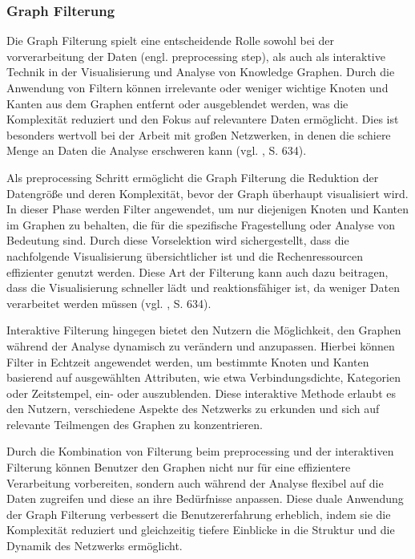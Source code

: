 \subsubsection{Graph Filterung}

Die Graph Filterung spielt eine entscheidende Rolle sowohl bei der vorverarbeitung der Daten (engl. preprocessing step), als auch als interaktive Technik in der Visualisierung und Analyse von Knowledge Graphen. Durch die Anwendung von Filtern können irrelevante oder weniger wichtige Knoten und Kanten aus dem Graphen entfernt oder ausgeblendet werden, was die Komplexität reduziert und den Fokus auf relevantere Daten ermöglicht. Dies ist besonders wertvoll bei der Arbeit mit großen Netzwerken, in denen die schiere Menge an Daten die Analyse erschweren kann (vgl. \cite{chen:SurveyGraphVisualization}, S. 634).

Als preprocessing Schritt ermöglicht die Graph Filterung die Reduktion der Datengröße und deren Komplexität, bevor der Graph überhaupt visualisiert wird. In dieser Phase werden Filter angewendet, um nur diejenigen Knoten und Kanten im Graphen zu behalten, die für die spezifische Fragestellung oder Analyse von Bedeutung sind. Durch diese Vorselektion wird sichergestellt, dass die nachfolgende Visualisierung übersichtlicher ist und die Rechenressourcen effizienter genutzt werden. Diese Art der Filterung kann auch dazu beitragen, dass die Visualisierung schneller lädt und reaktionsfähiger ist, da weniger Daten verarbeitet werden müssen (vgl. \cite{chen:SurveyGraphVisualization}, S. 634).

Interaktive Filterung hingegen bietet den Nutzern die Möglichkeit, den Graphen während der Analyse dynamisch zu verändern und anzupassen. Hierbei können Filter in Echtzeit angewendet werden, um bestimmte Knoten und Kanten basierend auf ausgewählten Attributen, wie etwa Verbindungsdichte, Kategorien oder Zeitstempel, ein- oder auszublenden. Diese interaktive Methode erlaubt es den Nutzern, verschiedene Aspekte des Netzwerks zu erkunden und sich auf relevante Teilmengen des Graphen zu konzentrieren.

Durch die Kombination von Filterung beim preprocessing und der interaktiven Filterung können Benutzer den Graphen nicht nur für eine effizientere Verarbeitung vorbereiten, sondern auch während der Analyse flexibel auf die Daten zugreifen und diese an ihre Bedürfnisse anpassen. Diese duale Anwendung der Graph Filterung verbessert die Benutzererfahrung erheblich, indem sie die Komplexität reduziert und gleichzeitig tiefere Einblicke in die Struktur und die Dynamik des Netzwerks ermöglicht.

